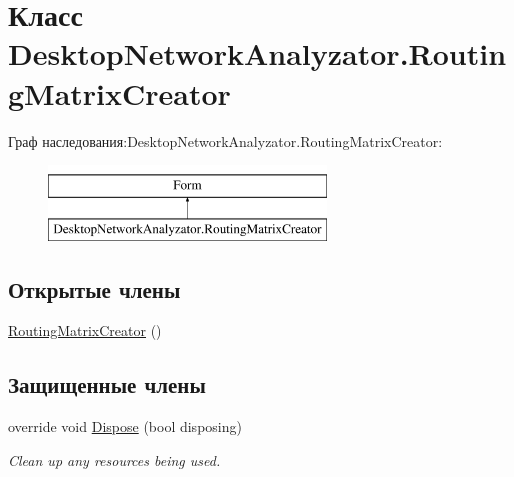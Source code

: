 \hypertarget{class_desktop_network_analyzator_1_1_routing_matrix_creator}{}\section{Класс Desktop\+Network\+Analyzator.\+Routing\+Matrix\+Creator}
\label{class_desktop_network_analyzator_1_1_routing_matrix_creator}
Граф наследования\+:Desktop\+Network\+Analyzator.\+Routing\+Matrix\+Creator\+:\begin{figure}[H]
\begin{center}
\leavevmode
\includegraphics[height=2.000000cm]{class_desktop_network_analyzator_1_1_routing_matrix_creator}
\end{center}
\end{figure}
\subsection*{Открытые члены}
\begin{DoxyCompactItemize}
\item 
\hyperlink{class_desktop_network_analyzator_1_1_routing_matrix_creator_ad70f5f1a2c271f609722bfd79072a235}{Routing\+Matrix\+Creator} ()
\end{DoxyCompactItemize}
\subsection*{Защищенные члены}
\begin{DoxyCompactItemize}
\item 
override void \hyperlink{class_desktop_network_analyzator_1_1_routing_matrix_creator_a1e0180682e5e3f0405f96f573cab3852}{Dispose} (bool disposing)
\begin{DoxyCompactList}\small\item\em Clean up any resources being used. \end{DoxyCompactList}\end{DoxyCompactItemize}
